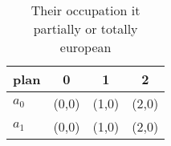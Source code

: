 \documentclass[a4paper]{article}
\begin{document}
\begin{table}
\begin{adjustbox}{width=0.6\columnwidth}
\begin{tabular}{|l|l|l|l|}
\hline
\textbf{plan} & \multicolumn{1}{c|}{\textbf{0}} & \multicolumn{1}{c|}{\textbf{1}} & \multicolumn{1}{c|}{\textbf{2}} \\ \hline
\textbf{$a_0$}  & (0,0) & (1,0) & (2,0) \\ \hline
\textbf{$a_1$}  & (0,0) & (1,0) & (2,0) \\ \hline
\end{tabular}
\end{adjustbox}
\caption{Their occupation it partially or totally european
}
\end{table}
\end{document}
